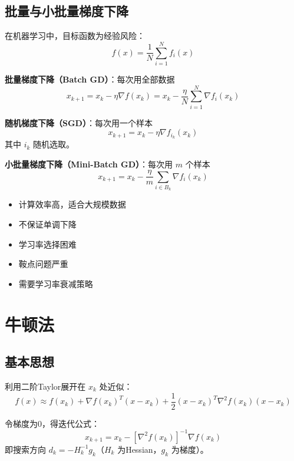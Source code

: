 \subsection{批量与小批量梯度下降}\label{sec:sgd}

\begin{conceptbox}
在机器学习中，目标函数为经验风险：
\[
f(x) = \frac{1}{N}\sum_{i=1}^{N} f_i(x)
\]

\textbf{批量梯度下降（Batch GD）}：每次用全部数据
\[
x_{k+1} = x_k - \eta \nabla f(x_k) = x_k - \frac{\eta}{N}\sum_{i=1}^{N} \nabla f_i(x_k)
\]

\textbf{随机梯度下降（SGD）}：每次用一个样本
\[
x_{k+1} = x_k - \eta \nabla f_{i_k}(x_k)
\]
其中 $i_k$ 随机选取。

\textbf{小批量梯度下降（Mini-Batch GD）}：每次用 $m$ 个样本
\[
x_{k+1} = x_k - \frac{\eta}{m}\sum_{i \in B_k} \nabla f_i(x_k)
\]
\end{conceptbox}

\begin{notebox}[SGD的特点]
\begin{itemize}
    \item 计算效率高，适合大规模数据
    \item 不保证单调下降
    \item 学习率选择困难
    \item 鞍点问题严重
    \item 需要学习率衰减策略
\end{itemize}
\end{notebox}

\section{牛顿法}\label{sec:newton}

\subsection{基本思想}

\begin{conceptbox}[牛顿法]
利用二阶Taylor展开在 $x_k$ 处近似：
\[
f(x) \approx f(x_k) + \nabla f(x_k)^T(x-x_k) + \frac{1}{2}(x-x_k)^T \nabla^2 f(x_k)(x-x_k)
\]

令梯度为0，得迭代公式：
\[
x_{k+1} = x_k - [\nabla^2 f(x_k)]^{-1} \nabla f(x_k)
\]
即搜索方向 $d_k = -H_k^{-1} g_k$（$H_k$ 为Hessian，$g_k$ 为梯度）。
\end{conceptbox}

